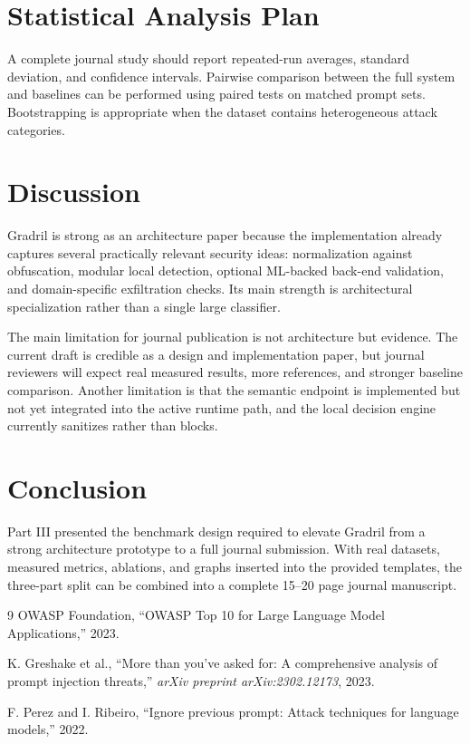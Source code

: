 \documentclass[journal]{IEEEtran}
\begin{document}
\section{Statistical Analysis Plan}
A complete journal study should report repeated-run averages, standard deviation, and confidence intervals. Pairwise comparison between the full system and baselines can be performed using paired tests on matched prompt sets. Bootstrapping is appropriate when the dataset contains heterogeneous attack categories.

\section{Discussion}
Gradril is strong as an architecture paper because the implementation already captures several practically relevant security ideas: normalization against obfuscation, modular local detection, optional ML-backed back-end validation, and domain-specific exfiltration checks. Its main strength is architectural specialization rather than a single large classifier.

The main limitation for journal publication is not architecture but evidence. The current draft is credible as a design and implementation paper, but journal reviewers will expect real measured results, more references, and stronger baseline comparison. Another limitation is that the semantic endpoint is implemented but not yet integrated into the active runtime path, and the local decision engine currently sanitizes rather than blocks.

\section{Conclusion}
Part III presented the benchmark design required to elevate Gradril from a strong architecture prototype to a full journal submission. With real datasets, measured metrics, ablations, and graphs inserted into the provided templates, the three-part split can be combined into a complete 15--20 page journal manuscript.

\begin{thebibliography}{9}
OWASP Foundation, ``OWASP Top 10 for Large Language Model Applications,'' 2023.

K. Greshake et al., ``More than you've asked for: A comprehensive analysis of prompt injection threats,'' \textit{arXiv preprint arXiv:2302.12173}, 2023.

F. Perez and I. Ribeiro, ``Ignore previous prompt: Attack techniques for language models,'' 2022.
\end{thebibliography}
\end{document}
